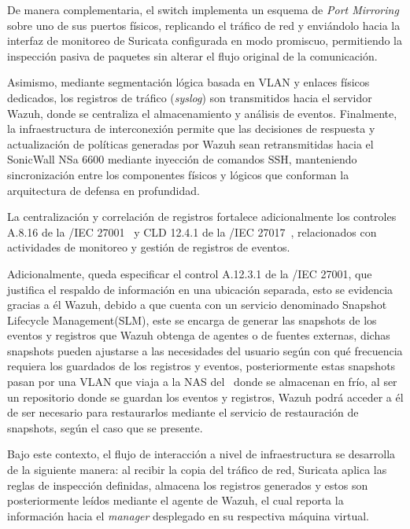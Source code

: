 De manera complementaria, el switch implementa un esquema de \textit{Port Mirroring} sobre uno de sus puertos físicos, replicando el 
tráfico de red y enviándolo hacia la interfaz de monitoreo de Suricata configurada en modo promiscuo, permitiendo la inspección pasiva de 
paquetes sin alterar el flujo original de la comunicación.

Asimismo, mediante segmentación lógica basada en VLAN y enlaces físicos dedicados, los registros de tráfico (\textit{syslog}) son 
transmitidos hacia el servidor Wazuh, donde se centraliza el almacenamiento y análisis de eventos. Finalmente, la infraestructura de 
interconexión permite que las decisiones de respuesta y actualización de políticas generadas por Wazuh sean retransmitidas hacia el 
SonicWall NSa 6600 mediante inyección de comandos SSH, manteniendo sincronización entre los componentes físicos y lógicos que conforman 
la arquitectura de defensa en profundidad.

La centralización y correlación de registros fortalece adicionalmente los controles A.8.16 de la \ISO/IEC 27001~\cite{iso27001} y 
CLD 12.4.1 de la \ISO/IEC 27017~\cite{iso27017}, relacionados con actividades de monitoreo y gestión de registros de eventos.

Adicionalmente, queda especificar el control A.12.3.1 de la \ISO/IEC 27001, que justifica el respaldo de información en una ubicación 
separada, esto se evidencia gracias a él \SIEM Wazuh, debido a que cuenta con un servicio denominado Snapshot Lifecycle Management(SLM), 
este se encarga de generar las snapshots de los eventos y registros que Wazuh obtenga de agentes o de fuentes externas, dichas snapshots 
pueden ajustarse a las necesidades del usuario según con qué frecuencia requiera los guardados de los registros y eventos, posteriormente 
estas snapshots pasan por una VLAN que viaja a la NAS del \GRID\ donde se almacenan en frío, al ser un repositorio donde se guardan los 
eventos y registros, Wazuh podrá acceder a él de ser necesario para restaurarlos mediante el servicio de restauración de snapshots, según 
el caso que se presente.

Bajo este contexto, el flujo de interacción a nivel de infraestructura se desarrolla de la siguiente manera: al recibir la copia del 
tráfico de red, Suricata aplica las reglas de inspección definidas, almacena los registros generados y estos son posteriormente leídos 
mediante el agente de Wazuh, el cual reporta la información hacia el \textit{manager} desplegado en su respectiva máquina virtual.

